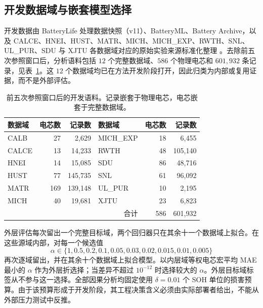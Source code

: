 \documentclass[UTF8,11pt]{ctexart}
\begin{document}
\subsection{开发数据域与嵌套模型选择}

开发数据由 BatteryLife 处理数据快照（v11）、BatteryML、Battery Archive，以及 CALCE、HNEI、HUST、MATR、MICH、MICH\_EXP、RWTH、SNL、UL\_PUR、SDU 与 XJTU 各数据域对应的原始实验来源标准化整理 \citep{zhang2024batteryml,tan2025batterylife,batterylife2026processed,batteryarchive,xing2013ensemble,devie2018variability,ma2022personalized,severson2019cyclelife,attia2020closedloop,weng2021formation,li2021oneshot,preger2020degradation,juarezrobles2020safety,wang2025sorting,wang2024pinn}。去除前五次参照窗口后，分析语料包括 $12$ 个完整数据域、$586$ 个物理电芯和 $601{,}932$ 条记录，见表~\ref{tab:data_zh}。这 $12$ 个数据域均已在方法开发阶段打开，因此归类为内部或复用证据，而不是外部评估。

\begin{table}[t]
\centering
\caption{前五次参照窗口后的开发语料。记录嵌套于物理电芯，电芯嵌套于完整数据域。}
\label{tab:data_zh}
\begin{tabular}{lrr@{\qquad}lrr}
\toprule
数据域 & 电芯数 & 记录数 & 数据域 & 电芯数 & 记录数 \\
\midrule
CALB & 27 & 2,629 & MICH\_EXP & 18 & 6,455 \\
CALCE & 13 & 14,233 & RWTH & 48 & 105,140 \\
HNEI & 14 & 15,085 & SDU & 86 & 48,716 \\
HUST & 77 & 145,735 & SNL & 61 & 96,092 \\
MATR & 169 & 139,148 & UL\_PUR & 10 & 2,195 \\
MICH & 40 & 19,681 & XJTU & 23 & 6,823 \\
\midrule
\multicolumn{4}{r}{合计} & 586 & 601,932 \\
\bottomrule
\end{tabular}
\end{table}

外层评估每次留出一个完整目标域，两个回归器只在其余十一个数据域上拟合。在这些源域内部，对每一个候选值
\[
\alpha\in\{1,0.5,0.2,0.1,0.05,0.03,0.02,0.015,0.01,0.005\}
\]
再次逐域留出，并在其余十个数据域上拟合模型。以内层域等权电芯宏平均 MAE 最小的 $\alpha$ 作为外层折选择；当差异不超过 $10^{-12}$ 时选择较大的 $\alpha$。外层目标域标签从不参与这一选择。全部因果分析均固定使用 $\delta=0.01$ 个 SOH 单位的损害预算。由于该预算形成于开发阶段，其工程决策含义必须由实际部署者给出，不能从外部压力测试中反推。
\end{document}
